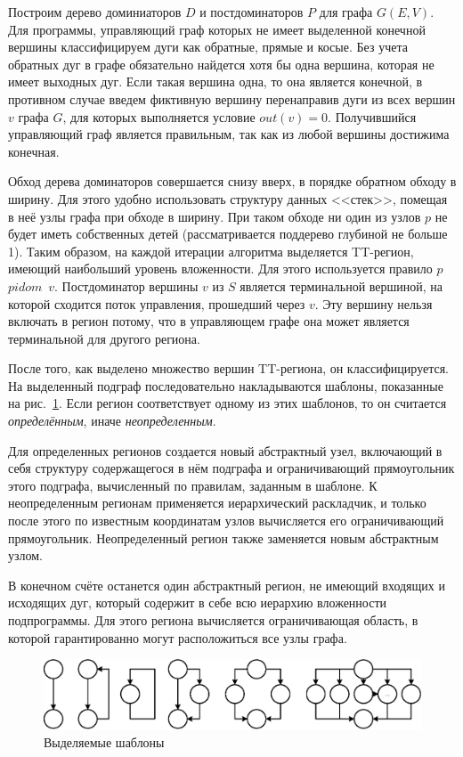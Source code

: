 \documentclass{jctart15a}
\begin{document}
Построим дерево доминиаторов $D$ и постдоминаторов $P$ для графа $G(E,V)$. Для программы, управляющий граф которых не имеет выделенной конечной вершины классифицируем дуги как обратные, прямые  и косые. Без учета обратных дуг в графе обязательно найдется хотя бы одна вершина, которая не имеет выходных дуг. Если такая вершина одна, то она является конечной, в противном случае введем фиктивную вершину перенаправив дуги из всех вершин $v$ графа $G$, для которых выполняется условие $out(v)=0$. Получившийся управляющий граф является правильным, так как из любой вершины достижима конечная.

	Обход дерева доминаторов совершается снизу вверх, в порядке обратном обходу в ширину. Для этого удобно использовать структуру данных <<стек>>, помещая в неё узлы графа при обходе в ширину. При таком обходе ни один из узлов $p$ не будет иметь собственных детей (рассматривается поддерево глубиной не больше 1). Таким образом, на каждой итерации алгоритма выделяется TT-регион, имеющий наибольший уровень вложенности. Для этого используется правило $p$~$pidom$~$v$. Постдоминатор вершины $v$ из $S$ является терминальной вершиной, на которой сходится поток управления, прошедший через $v$. Эту вершину нельзя включать в регион потому, что в управляющем графе она может является терминальной для другого региона.

	После того, как выделено множество вершин TT-региона, он классифицируется. На выделенный подграф последовательно накладываются шаблоны, показанные на рис.~\ref{fig:Regions}. Если регион соответствует одному из этих шаблонов, то он считается \textit{определённым}, иначе \textit{неопределенным}.

	Для определенных регионов создается новый абстрактный узел, включающий в себя структуру содержащегося в нём подграфа и ограничивающий прямоугольник этого подграфа, вычисленный по правилам, заданным в шаблоне. К неопределенным регионам применяется иерархический раскладчик, и только после этого по известным координатам узлов вычисляется его ограничивающий прямоугольник. Неопределенный регион также заменяется новым абстрактным узлом.

	В конечном счёте останется один абстрактный регион, не имеющий входящих и исходящих дуг, который содержит в себе всю иерархию вложенности подпрограммы. Для этого региона вычисляется ограничивающая область, в которой гарантированно могут расположиться все узлы графа.

\begin{figure}[htbp]
	\centering
		\includegraphics[width=1\textwidth]{Pic/Reg.eps}
	\caption{Выделяемые шаблоны}
	\label{fig:Regions}
\end{figure}
\end{document}
